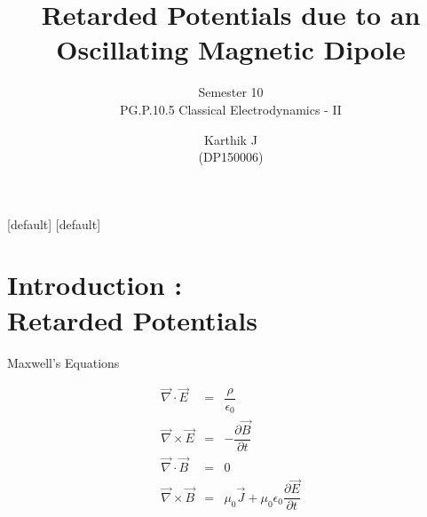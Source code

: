 \documentclass[10pt,aspectratio=169]{beamer}
\newcommand{\Div}[1]{\vec{\nabla}\cdot\vec{#1}}
\newcommand{\Curl}[1]{\vec{\nabla}\times\vec{#1}}
\newcommand{\pdert}[1]{\dfrac{\partial#1}{\partial t}}
\begin{document}
	\author{Karthik J\\(DP150006)}
	\title{Retarded Potentials due to an \\Oscillating Magnetic Dipole}
	\subtitle{\vspace{20pt}Semester 10\\PG.P.10.5 Classical Electrodynamics - II}
	[default]
	[default]
	\begin{frame}[plain]
		\maketitle
	\end{frame}
	
	\section{Introduction : \\Retarded Potentials}
	
	\begin{frame}
		{Maxwell's Equations}
		
		\begin{tcolorbox}
			\begin{eqnarray}
			\Div{E} &=& \dfrac{\rho}{\epsilon_0} \label{eqn : Max1} \\
			\Curl{E} &=& -\pdert{\vec{B}} \label{eqn : Max2}\\
			\Div{B} &=& 0 \label{eqn : Max3}\\
			\Curl{B} &=& \mu_0 \vec{J} + \mu_0 \epsilon_0 \pdert{\vec{E}} \label{eqn : Max4}
			\end{eqnarray}
		\end{tcolorbox}
	\end{frame}
	
\end{document}
